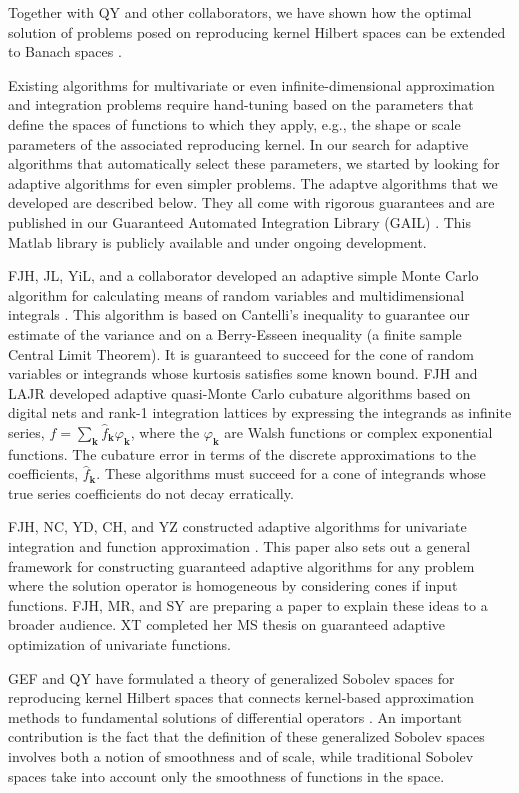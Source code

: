 \documentclass[11pt]{NSFamsart}
\newcommand{\hatf}{\hat{f}}
\newcommand{\bk}{{\boldsymbol{k}}}
\newcommand{\Matlab}{{\sc Matlab}\xspace}
\begin{document}
Together with QY and other collaborators, we have shown how the optimal solution of problems posed on reproducing kernel Hilbert spaces can be extended to Banach spaces \citep{SonZhaHic12a, FasHicYe13a}.

Existing algorithms for multivariate or even infinite-dimensional approximation and integration problems require hand-tuning based on the parameters that define the spaces of functions to which they apply, e.g., the shape or scale parameters of the associated reproducing kernel.  In our search for adaptive algorithms that automatically select these parameters, we started by looking for adaptive algorithms for even simpler problems. The adaptve algorithms that we developed are described below.  They all come with rigorous guarantees and are published in our Guaranteed Automated Integration Library (GAIL) \citep{ChoEtal14a}.  This \Matlab library is publicly available and under ongoing development.

FJH, JL, YiL, and a collaborator developed an adaptive simple Monte Carlo algorithm for calculating means of random variables and multidimensional integrals \citep{HicEtal14a}.  This algorithm is based on Cantelli's inequality to guarantee our estimate of the variance and on a Berry-Esseen inequality (a finite sample Central Limit Theorem).  It is guaranteed to succeed for the cone of random variables or integrands whose kurtosis satisfies some known bound.  FJH and LAJR developed adaptive quasi-Monte Carlo cubature algorithms based on digital nets \citep{HicJim16a} and rank-1 integration lattices \citep{JimHic16a} by expressing the integrands as infinite series, $f=\sum_{\bk} \hatf_\bk \varphi_{\bk}$, where the $\varphi_{\bk}$ are Walsh functions or complex exponential functions.  The cubature error in terms of the discrete  approximations to the coefficients, $\hatf_\bk$.  These algorithms must succeed for a cone of integrands whose true series coefficients do not decay erratically.

FJH, NC, YD, CH, and YZ constructed adaptive algorithms for univariate integration and function approximation \citep{HicEtal14b}.  This paper also sets out a general framework for constructing guaranteed adaptive algorithms for any problem where the solution operator is homogeneous by considering cones if input functions.  FJH, MR, and SY are preparing a paper to explain these ideas to a broader audience.  XT completed her MS thesis \citep{Ton14a} on guaranteed adaptive optimization of univariate functions.


GEF and QY have formulated a theory of generalized Sobolev spaces for reproducing kernel Hilbert spaces that connects kernel-based approximation methods to fundamental solutions of differential operators \cite{FasshauerYe11, FasshauerYe13}. An important contribution is the fact that the definition of these generalized Sobolev spaces involves both a notion of smoothness and of scale, while traditional Sobolev spaces take into account only the smoothness of functions in the space.
\end{document}
